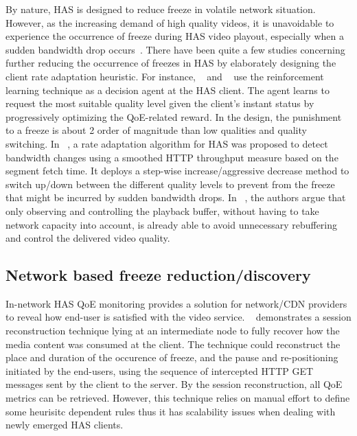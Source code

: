\documentclass[journal]{IEEEtran}
\begin{document}
By nature, HAS is designed to reduce freeze in volatile network situation. However, as the increasing demand of high quality videos, it is unavoidable to experience the occurrence of freeze during HAS video playout, especially when a sudden bandwidth drop occurs~\cite{akhshabi2012experimental,riiser2012comparison}. There have been quite a few studies concerning further reducing the occurrence of freezes in HAS by elaborately designing the client rate adaptation heuristic. For instance, ~\cite{claeys2014design} and ~\cite{wu2014factor} use the reinforcement learning technique as a decision agent at the HAS client. The agent learns to request the most suitable quality level given the client's instant status by progressively optimizing the QoE-related reward. In the design, the punishment to a freeze is about 2 order of magnitude than low qualities and quality switching. In ~\cite{liu2011rate}, a rate adaptation algorithm for HAS was proposed to detect bandwidth changes using a smoothed HTTP throughput measure based on the segment fetch time. It deploys a step-wise increase/aggressive decrease method to switch up/down between the different quality levels to prevent from the freeze that might be incurred by sudden bandwidth drops. In ~\cite{huang2013downton, huang2014using}, the authors argue that only observing and controlling the playback buffer, without having to take network capacity into account, is already able to avoid unnecessary rebuffering and control the delivered video quality. 

\subsection{Network based freeze reduction/discovery}
In-network HAS QoE monitoring provides a solution for network/CDN providers to reveal how end-user is satisfied with the video service. ~\cite{huysegems2012session} demonstrates a session reconstruction technique lying at an intermediate node to fully recover how the media content was consumed at the client. The technique could reconstruct the place and duration of the occurence of freeze, and the pause and re-positioning initiated by the end-users, using the sequence of intercepted HTTP GET messages sent by the client to the server. By the session reconstruction, all QoE metrics can be retrieved. However, this technique relies on manual effort to define some heurisitc dependent rules thus it has scalability issues when dealing with newly emerged HAS clients.
\end{document}

